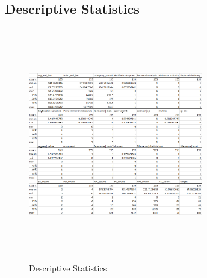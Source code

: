 \documentclass[conference]{IEEEtran}
\begin{document}
\subsection{Descriptive Statistics}
\begin{figure}[h]
\centerline{\includegraphics[width=3in, height=4in]{desc-stats.PNG}}
\caption{Descriptive Statistics}
\label{fig}
\end{figure}
\end{document}
